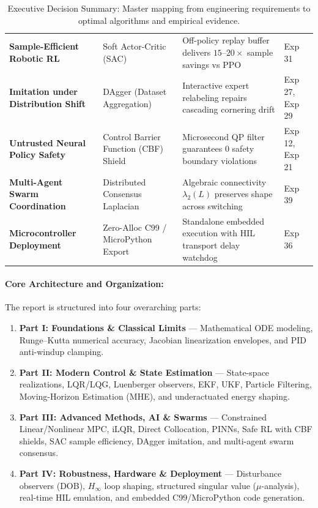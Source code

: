 \documentclass[11pt,a4paper]{article}
\begin{document}
\begin{table}[H]
{\begin{tabular}{@{}llll@{}}
\textbf{Sample-Efficient Robotic RL} & Soft Actor-Critic (SAC) & Off-policy replay buffer delivers $15\text{--}20\times$ sample savings vs PPO & Exp 31 \\
\textbf{Imitation under Distribution Shift} & DAgger (Dataset Aggregation) & Interactive expert relabeling repairs cascading cornering drift & Exp 27, Exp 29 \\
\textbf{Untrusted Neural Policy Safety} & Control Barrier Function (CBF) Shield & Microsecond QP filter guarantees $0$ safety boundary violations & Exp 12, Exp 21 \\
\textbf{Multi-Agent Swarm Coordination} & Distributed Consensus Laplacian & Algebraic connectivity $\lambda_2(L)$ preserves shape across switching & Exp 39 \\
\textbf{Microcontroller Deployment} & Zero-Alloc C99 / MicroPython Export & Standalone embedded execution with HIL transport delay watchdog & Exp 36 \\
\bottomrule
\end{tabular}%
}
\caption{Executive Decision Summary: Master mapping from engineering requirements to optimal algorithms and empirical evidence.}
\label{tab:exec_summary}
\end{table}

\paragraph{Core Architecture and Organization:}
The report is structured into four overarching parts:
\begin{enumerate}[nosep]
  \item \textbf{Part I: Foundations \& Classical Limits} --- Mathematical ODE modeling, Runge--Kutta numerical accuracy, Jacobian linearization envelopes, and PID anti-windup clamping.
  \item \textbf{Part II: Modern Control \& State Estimation} --- State-space realizations, LQR/LQG, Luenberger observers, EKF, UKF, Particle Filtering, Moving-Horizon Estimation (MHE), and underactuated energy shaping.
  \item \textbf{Part III: Advanced Methods, AI \& Swarms} --- Constrained Linear/Nonlinear MPC, iLQR, Direct Collocation, PINNs, Safe RL with CBF shields, SAC sample efficiency, DAgger imitation, and multi-agent swarm consensus.
  \item \textbf{Part IV: Robustness, Hardware \& Deployment} --- Disturbance observers (DOB), $H_\infty$ loop shaping, structured singular value ($\mu$-analysis), real-time HIL emulation, and embedded C99/MicroPython code generation.
\end{enumerate}
\end{document}
